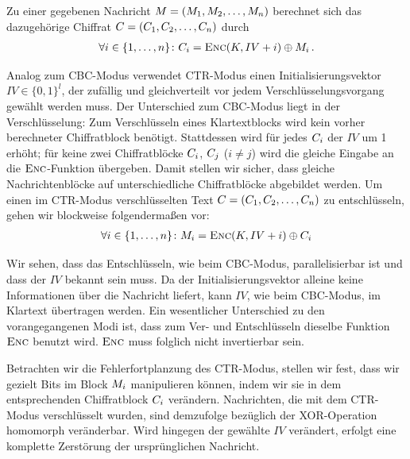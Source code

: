 Zu einer gegebenen Nachricht $M = (M_{1},M_{2},\dots,M_{n})$ berechnet sich das dazugehörige Chiffrat $C = (C_{1},C_{2}, \dots,C_{n})$ durch
\begin{align*}
  \forall i \in \{1,\dots,n\}\colon C_i = \textsc{Enc}(K, IV + i)
  \oplus M_i\, . 
\end{align*}

Analog zum CBC-Modus verwendet CTR-Modus einen Initialisierungsvektor
$IV \in \{0,1\}^{l}$, der zufällig und gleichverteilt vor jedem
Verschlüsselungsvorgang gewählt werden muss. Der Unterschied zum
CBC-Modus liegt in der Verschlüsselung: Zum Verschlüsseln eines
Klartextblocks wird kein vorher berechneter Chiffratblock
benötigt. Stattdessen wird für jedes $C_i$ der $IV$ um 1 erhöht;
für keine zwei Chiffratblöcke $C_i$, $C_j$ ($i \neq j$)
wird die gleiche Eingabe an die $\textsc{Enc}$-Funktion übergeben. Damit stellen
wir sicher, dass gleiche Nachrichtenblöcke auf unterschiedliche
Chiffratblöcke abgebildet werden. Um einen im CTR-Modus verschlüsselten
Text $C = (C_{1},C_{2},\dots,C_{n})$ zu
entschlüsseln, gehen wir blockweise folgendermaßen vor:
\begin{align*}
  \forall i \in \{1,\dots,n\}\colon M_i = \textsc{Enc}(K, IV + i) \oplus C_i
\end{align*}

Wir sehen, dass das Entschlüsseln, wie beim CBC-Modus, parallelisierbar
ist und dass der $IV$ bekannt sein muss. Da der Initialisierungsvektor
alleine keine Informationen über die Nachricht liefert, kann $IV$, wie
beim CBC-Modus, im Klartext übertragen werden. Ein wesentlicher
Unterschied zu den vorangegangenen Modi ist, dass zum Ver- und
Entschlüsseln dieselbe Funktion $\textsc{Enc}$ benutzt wird. $\textsc{Enc}$ muss
folglich nicht invertierbar sein.

Betrachten wir die Fehlerfortplanzung des CTR-Modus, stellen wir fest,
dass wir gezielt Bits im Block $M_i$ manipulieren können, indem
wir sie in dem entsprechenden Chiffratblock $C_i$
verändern. Nachrichten, die mit dem CTR-Modus verschlüsselt wurden, sind
demzufolge bezüglich der XOR-Operation homomorph veränderbar. Wird
hingegen der gewählte $IV$ verändert, erfolgt eine komplette Zerstörung
der ursprünglichen Nachricht.

